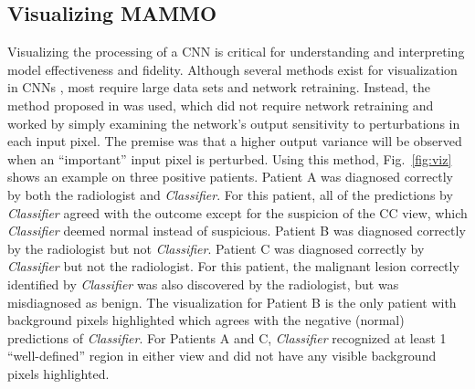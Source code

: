 \documentclass[journal]{IEEEtran}
\begin{document}
\subsection{Visualizing MAMMO}

Visualizing the processing of a CNN is critical for understanding and interpreting model effectiveness and fidelity.  Although several methods exist for visualization in CNNs \cite{visualizing1, visualizing2, visualizing3}, most require large data sets and network retraining.  Instead, the method proposed in \cite{krysztof-etal-2017} was used, which did not require network retraining and worked by simply examining the network's output sensitivity to perturbations in each input pixel.  The premise was that a higher output variance will be observed when an ``important'' input pixel is perturbed.  Using this method, Fig.~\ref{fig:viz} shows an example on three positive patients.   Patient A was diagnosed correctly by both the radiologist and \textit{Classifier}.  For this patient, all of the predictions by \textit{Classifier} agreed with the outcome except for the suspicion of the CC view, which \textit{Classifier} deemed normal instead of suspicious. Patient B was diagnosed correctly by the radiologist but not \textit{Classifier}. Patient C was diagnosed correctly by \textit{Classifier} but not the radiologist.  For this patient, the malignant lesion correctly identified by \textit{Classifier} was also discovered by the radiologist, but was misdiagnosed as benign.  The visualization for Patient B is the only patient with background pixels highlighted which agrees with the negative (normal) predictions of \textit{Classifier}.  For Patients A and C, \textit{Classifier} recognized at least 1 ``well-defined'' region in either view and did not have any visible background pixels highlighted.  
\end{document}

